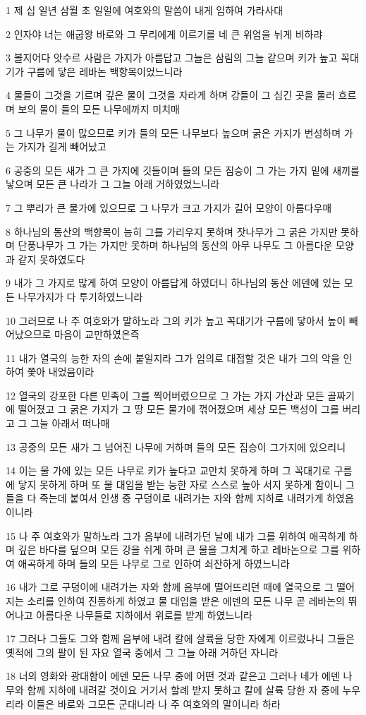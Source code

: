 \par 1 제 십 일년 삼월 초 일일에 여호와의 말씀이 내게 임하여 가라사대
\par 2 인자야 너는 애굽왕 바로와 그 무리에게 이르기를 네 큰 위엄을 뉘게 비하랴
\par 3 볼지어다 앗수르 사람은 가지가 아름답고 그늘은 삼림의 그늘 같으며 키가 높고 꼭대기가 구름에 닿은 레바논 백향목이었느니라
\par 4 물들이 그것을 기르며 깊은 물이 그것을 자라게 하며 강들이 그 심긴 곳을 둘러 흐르며 보의 물이 들의 모든 나무에까지 미치매
\par 5 그 나무가 물이 많으므로 키가 들의 모든 나무보다 높으며 굵은 가지가 번성하며 가는 가지가 길게 빼어났고
\par 6 공중의 모든 새가 그 큰 가지에 깃들이며 들의 모든 짐승이 그 가는 가지 밑에 새끼를 낳으며 모든 큰 나라가 그 그늘 아래 거하였었느니라
\par 7 그 뿌리가 큰 물가에 있으므로 그 나무가 크고 가지가 길어 모양이 아름다우매
\par 8 하나님의 동산의 백향목이 능히 그를 가리우지 못하며 잣나무가 그 굵은 가지만 못하며 단풍나무가 그 가는 가지만 못하며 하나님의 동산의 아무 나무도 그 아름다운 모양과 같지 못하였도다
\par 9 내가 그 가지로 많게 하여 모양이 아름답게 하였더니 하나님의 동산 에덴에 있는 모든 나무가지가 다 투기하였느니라
\par 10 그러므로 나 주 여호와가 말하노라 그의 키가 높고 꼭대기가 구름에 닿아서 높이 빼어났으므로 마음이 교만하였은즉
\par 11 내가 열국의 능한 자의 손에 붙일지라 그가 임의로 대접할 것은 내가 그의 악을 인하여 쫓아 내었음이라
\par 12 열국의 강포한 다른 민족이 그를 찍어버렸으므로 그 가는 가지 가산과 모든 골짜기에 떨어졌고 그 굵은 가지가 그 땅 모든 물가에 꺾어졌으며 세상 모든 백성이 그를 버리고 그 그늘 아래서 떠나매
\par 13 공중의 모든 새가 그 넘어진 나무에 거하며 들의 모든 짐승이 그가지에 있으리니
\par 14 이는 물 가에 있는 모든 나무로 키가 높다고 교만치 못하게 하며 그 꼭대기로 구름에 닿지 못하게 하며 또 물 대임을 받는 능한 자로 스스로 높아 서지 못하게 함이니 그들을 다 죽는데 붙여서 인생 중 구덩이로 내려가는 자와 함께 지하로 내려가게 하였음이니라
\par 15 나 주 여호와가 말하노라 그가 음부에 내려가던 날에 내가 그를 위하여 애곡하게 하며 깊은 바다를 덮으며 모든 강을 쉬게 하며 큰 물을 그치게 하고 레바논으로 그를 위하여 애곡하게 하며 들의 모든 나무로 그로 인하여 쇠잔하게 하였느니라
\par 16 내가 그로 구덩이에 내려가는 자와 함께 음부에 떨어뜨리던 때에 열국으로 그 떨어지는 소리를 인하여 진동하게 하였고 물 대임을 받은 에덴의 모든 나무 곧 레바논의 뛰어나고 아름다운 나무들로 지하에서 위로를 받게 하였느니라
\par 17 그러나 그들도 그와 함께 음부에 내려 칼에 살륙을 당한 자에게 이르렀나니 그들은 옛적에 그의 팔이 된 자요 열국 중에서 그 그늘 아래 거하던 자니라
\par 18 너의 영화와 광대함이 에덴 모든 나무 중에 어떤 것과 같은고 그러나 네가 에덴 나무와 함께 지하에 내려갈 것이요 거기서 할례 받지 못하고 칼에 살륙 당한 자 중에 누우리라 이들은 바로와 그모든 군대니라 나 주 여호와의 말이니라 하라

